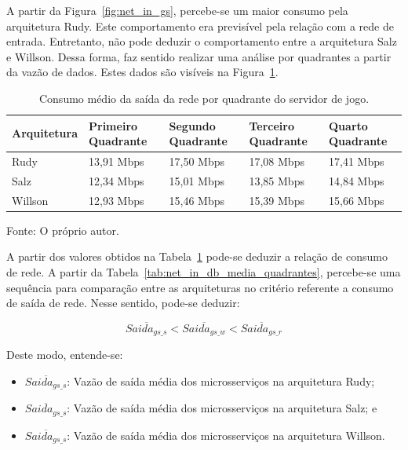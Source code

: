 A partir da Figura~\ref{fig:net_in_gs}, percebe-se um maior consumo pela arquitetura Rudy.
%
Este comportamento era previsível pela relação com a rede de entrada.
%
Entretanto, não pode deduzir o comportamento entre a arquitetura Salz e Willson.
%
Dessa forma, faz sentido realizar uma análise por quadrantes a partir da vazão de dados.
%
Estes dados são visíveis na Figura~\ref{tab:net_out_gs_media_quadrantes}.

\begin{table}[htb!]
\centering
\begin{adjustbox}{max width=\textwidth}
\caption{Consumo médio da saída da rede por quadrante do servidor de jogo.}
\label{tab:net_out_gs_media_quadrantes}

\begin{tabular}{l|l|l|l|l}
\hline \hline
Arquitetura & Primeiro Quadrante & Segundo Quadrante & Terceiro Quadrante & Quarto Quadrante \\ \hline \hline
Rudy        & 13,91 Mbps            & 17,50 Mbps           & 17,08 Mbps            & 17,41 Mbps          \\ \hline
Salz        & 12,34 Mbps            & 15,01 Mbps           & 13,85 Mbps            & 14,84 Mbps          \\ \hline
Willson     & 12,93 Mbps            & 15,46 Mbps          & 15,39 Mbps            & 15,66 Mbps          \\ \hline \hline
\end{tabular}
\end{adjustbox}

Fonte: O próprio autor.
\end{table}

A partir dos valores obtidos na Tabela~\ref{tab:net_out_gs_media_quadrantes} pode-se deduzir a relação de consumo de rede.
%
A partir da Tabela~\ref{tab:net_in_db_media_quadrantes}, percebe-se uma sequência para comparação entre as arquiteturas no critério referente a consumo de saída de rede.
%
Nesse sentido, pode-se deduzir:

$$
    \overline{Saida_{gs\_s}} < \overline{Saida_{gs\_w}} < \overline{Saida_{gs\_r}}
$$

Deste modo, entende-se:

\begin{itemize}
 \item $\overline{Saida_{gs\_s}}$: Vazão de saída média dos microsserviços na arquitetura Rudy;
 \item $\overline{Saida_{gs\_s}}$: Vazão de saída média dos microsserviços na arquitetura Salz; e
 \item $\overline{Saida_{gs\_s}}$: Vazão de saída média dos microsserviços na arquitetura Willson.
\end{itemize}

